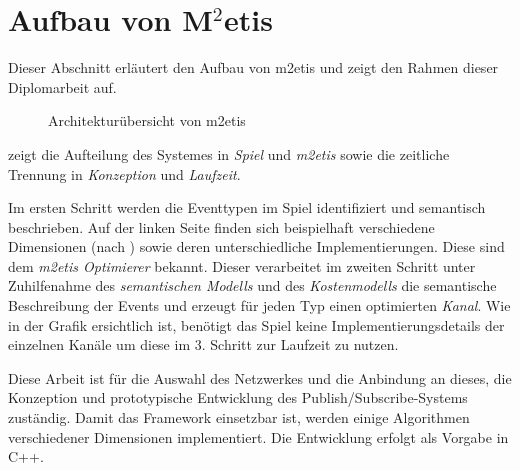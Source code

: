 \section{Aufbau von M$^2$etis}
\label{chap:grundlagen:aufbau_metis}

Dieser Abschnitt erläutert den Aufbau von \ac{m2etis} \cite{Fischer2010a, Fischer2010Event} und zeigt den Rahmen dieser Diplomarbeit auf. 

\begin{figure}[htbp]
\centering
{}
\caption{Architekturübersicht von \ac{m2etis}}
\label{fig:metis_aufbau}
\end{figure}

 zeigt die Aufteilung des Systemes in \emph{Spiel} und \emph{\ac{m2etis}} sowie die zeitliche Trennung in \emph{Konzeption} und \emph{Laufzeit}.

Im ersten Schritt werden die Eventtypen im Spiel identifiziert und semantisch beschrieben. Auf der linken Seite finden sich beispielhaft verschiedene Dimensionen (nach \cite{Fischer2010a}) sowie deren unterschiedliche Implementierungen. Diese sind dem \emph{\ac{m2etis} Optimierer} bekannt. Dieser verarbeitet im zweiten Schritt unter Zuhilfenahme des \emph{semantischen Modells} und des \emph{Kostenmodells} die semantische Beschreibung der Events und erzeugt für jeden Typ einen optimierten \emph{Kanal}. Wie in der Grafik ersichtlich ist, benötigt das Spiel keine  Implementierungsdetails der einzelnen Kanäle um diese im 3. Schritt zur Laufzeit zu nutzen.

Diese Arbeit ist für die Auswahl des Netzwerkes und die Anbindung an dieses, die Konzeption und prototypische Entwicklung des Publish/Subscribe-Systems zuständig. Damit das Framework einsetzbar ist, werden einige Algorithmen verschiedener Dimensionen implementiert. Die Entwicklung erfolgt als Vorgabe in C++.
